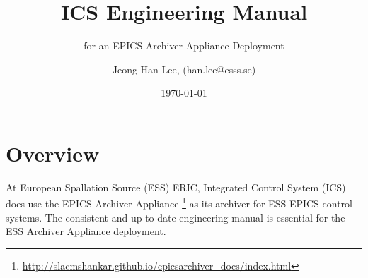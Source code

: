 \documentclass[11pt
  , a4paper
  , article
  , oneside
  , showtrims
]{memoir}
\begin{document}


\date{\today}




\title{ICS Engineering Manual}
\subtitle{for an EPICS Archiver Appliance Deployment}
\author{Jeong Han Lee, (han.lee@esss.se)}



\showtrimson

\esstitle
\newpage
\tableofcontents
\newpage



\chapter{Overview}
At European Spallation Source (ESS) ERIC, Integrated Control System (ICS) does use the EPICS Archiver Appliance {\footnote{\url{http://slacmshankar.github.io/epicsarchiver_docs/index.html}}} as its archiver for ESS EPICS control systems. The consistent and up-to-date engineering manual is essential for the ESS Archiver Appliance deployment.
\end{document}
